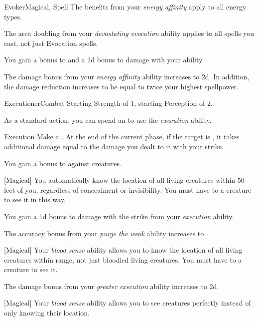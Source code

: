 \begin{feat}{Evoker}{Magical, Spell}
         The benefits from your \textit{energy affinity} apply to all energy types.

         The area doubling from your \textit{devastating evocation} ability applies to all spells you cast, not just Evocation spells.

         You gain a  bonus to  and a \plus1d bonus to damage with your  ability.

         The damage bonus from your \textit{energy affinity} ability increases to \plus2d.
        In addition, the damage reduction increases to be equal to twice your highest spellpower.
    \end{feat}

    \begin{feat}{Executioner}{Combat}
        \featpres Starting Strength of 1, starting Perception of 2.

         As a standard action, you can spend an  to use the \textit{execution} ability.
        \begin{ability}{Execution}
            Make a .
            At the end of the current phase, if the target is , it takes additional damage equal to the damage you dealt to it with your strike.
        \end{ability}

         You gain a  bonus to  against  creatures.

        [Magical] You automatically know the location of all  living creatures within 50 feet of you, regardless of concealment or invisibility.
        You must have  to a creature to see it in this way.

         You gain a \plus1d bonus to damage with the strike from your \textit{execution} ability.

         The accuracy bonus from your \textit{purge the weak} ability increases to .

        [Magical] Your \textit{blood sense} ability allows you to know the location of all living creatures within range, not just bloodied living creatures.
        You must have  to a creature to see it.

         The damage bonus from your \textit{greater execution} ability increases to \plus2d.

        [Magical] Your \textit{blood sense} ability allows you to see creatures perfectly instead of only knowing their location.
    \end{feat}

